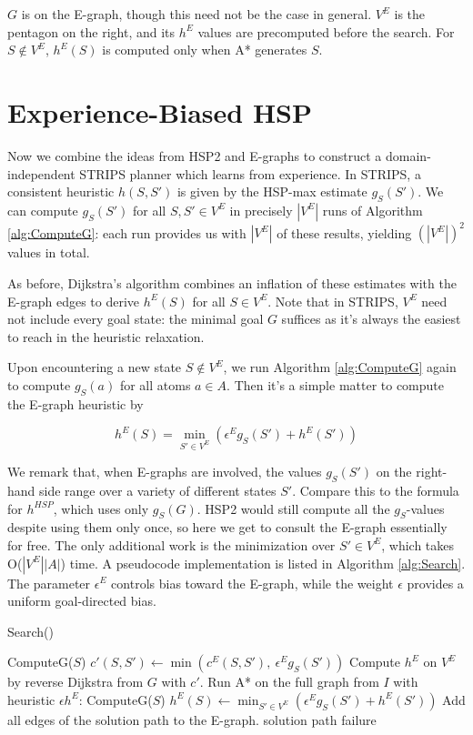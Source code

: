 \documentclass[letterpaper]{article}
\begin{document}
$G$ is on the E-graph, though this need not be the case in general. $V^E$ is the pentagon on the right, and its $h^E$ values are precomputed before the search. For $S\notin V^E$, $h^E(S)$ is computed only when A* generates $S$.

\section{Experience-Biased HSP}

Now we combine the ideas from HSP2 and E-graphs to construct a domain-independent STRIPS planner which learns from experience. In STRIPS, a consistent heuristic $h(S,S')$ is given by the HSP-max estimate $g_S(S')$. We can compute $g_S(S')$ for all $S,S'\in V^E$ in precisely $|V^E|$ runs of Algorithm \ref{alg:ComputeG}: each run provides us with $|V^E|$ of these results, yielding $(|V^E|)^2$ values in total.

As before, Dijkstra's algorithm combines an inflation of these estimates with the E-graph edges to derive $h^E(S)$ for all $S\in V^E$. Note that in STRIPS, $V^E$ need not include every goal state: the minimal goal $G$ suffices as it's always the easiest to reach in the heuristic relaxation.

Upon encountering a new state $S\notin V^E$, we run Algorithm \ref{alg:ComputeG} again to compute $g_S(a)$ for all atoms $a\in A$. Then it's a simple matter to compute the E-graph heuristic by

\[h^E(S) = \min_{S'\in V^E} \left( \epsilon^E g_S(S') + h^E(S') \right)\]

We remark that, when E-graphs are involved, the values $g_S(S')$ on the right-hand side range over a variety of different states $S'$. Compare this to the formula for $h^{HSP}$, which uses only $g_S(G)$. HSP2 would still compute all the $g_S$-values despite using them only once, so here we get to consult the E-graph essentially for free. The only additional work is the minimization over $S'\in V^E$, which takes O($|V^E||A|$) time. A pseudocode implementation is listed in Algorithm \ref{alg:Search}. The parameter $\epsilon^E$ controls bias toward the E-graph, while the weight $\epsilon$ provides a uniform goal-directed bias.

\begin{algorithm}
\caption{Search()}
\label{alg:Search}
\begin{algorithmic}
\STATE ComputeG($S$)
\STATE $c'(S,S') \leftarrow \min\left(c^E(S,S'),~\epsilon^E g_S(S')\right)$
\ENDFOR
\ENDFOR
\STATE Compute $h^E$ on $V^E$ by reverse Dijkstra from $G$ with $c'$.
\STATE Run A* on the full graph from $I$ with heuristic $\epsilon h^E$:
\STATE ComputeG($S$)
\STATE $h^E(S) \leftarrow \min_{S'\in V^E} \left( \epsilon^E g_S(S') + h^E(S') \right)$
\ENDFOR
{}
\STATE Add all edges of the solution path to the E-graph.
\RETURN solution path
\ELSE
\RETURN failure
\ENDIF
\end{algorithmic}
\end{algorithm}
\end{document}
